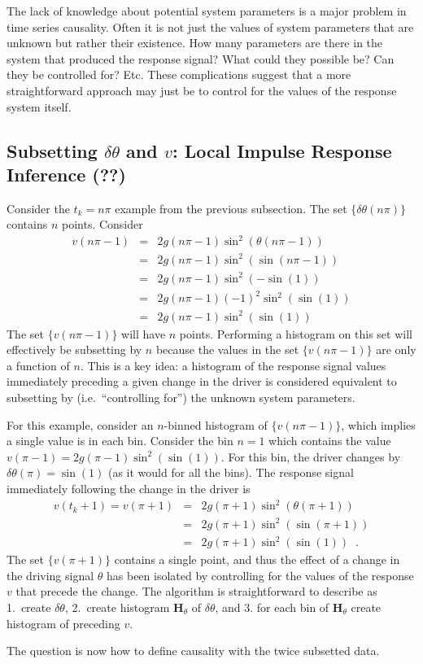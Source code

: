 \documentclass[a4paper,11pt]{article}
\begin{document}
The lack of knowledge about potential system parameters is a major problem in time series causality.  Often it is not just the values of system parameters that are unknown but rather their existence.  How many parameters are there in the system that produced the response signal?  What could they possible be?  Can they be controlled for? Etc.  These complications suggest that a more straightforward approach may just be to control for the values of the response system itself.  

\subsection{Subsetting $\delta\theta$ and $v$: Local Impulse Response Inference (??)}

Consider the $t_k=n\pi$ example from the previous subsection.  The set $\{\delta\theta(n\pi)\}$ contains $n$ points.  Consider
\begin{eqnarray*}
v(n\pi-1) &=& 2g\left(n\pi-1\right)\sin^2 \left(\theta(n\pi-1)\right)\\
&=& 2g\left(n\pi-1\right)\sin^2 \left(\sin(n\pi-1)\right)\\
&=& 2g\left(n\pi-1\right)\sin^2 \left(-\sin(1)\right)\\
&=& 2g\left(n\pi-1\right)\left(-1\right)^2\sin^2 \left(\sin(1)\right)\\
&=& 2g\left(n\pi-1\right)\sin^2 \left(\sin(1)\right)
\end{eqnarray*}
The set $\{v(n\pi-1)\}$ will have $n$ points.  Performing a histogram on this set will effectively be subsetting by $n$ because the values in the set $\{v(n\pi-1)\}$ are only a function of $n$.  This is a key idea: a histogram of the response signal values immediately preceding a given change in the driver is considered equivalent to subsetting by (i.e.\ ``controlling for'') the unknown system parameters.

For this example, consider an $n$-binned histogram of $\{v(n\pi-1)\}$, which implies a single value is in each bin.  Consider the bin $n=1$ which contains the value $v(\pi-1)=2g\left(\pi-1\right)\sin^2 \left(\sin(1)\right)$.  For this bin, the driver changes by $\delta\theta(\pi)=\sin(1)$ (as it would for all the bins).  The response signal immediately following the change in the driver is 
\begin{eqnarray*}
v(t_k+1) = v(\pi+1) &=& 2g\left(\pi+1\right)\sin^2 \left(\theta(\pi+1)\right)\\
&=& 2g\left(\pi+1\right)\sin^2 \left(\sin(\pi+1)\right)\\
&=& 2g\left(\pi+1\right)\sin^2 \left(\sin(1)\right)\;\;.
\end{eqnarray*}
The set $\{v(\pi+1)\}$ contains a single point, and thus the effect of a change in the driving signal $\theta$ has been isolated by controlling for the values of the response $v$ that precede the change.  The algorithm is straightforward to describe as 1.\ create $\delta\theta$, 2.\ create histogram $\mathbf{H}_\theta$ of $\delta\theta$, and 3. for each bin of $\mathbf{H}_\theta$ create histogram of preceding $v$.  

The question is now how to define causality with the twice subsetted data.
\end{document}
